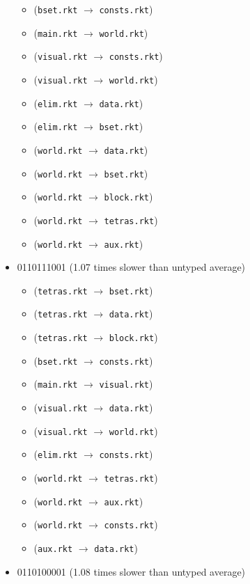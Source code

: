 \documentclass{article}
\newcommand{\mono}[1]{\texttt{#1}}
\begin{document}
\begin{itemize}
\begin{itemize}
  \item (\mono{bset.rkt} $\rightarrow$ \mono{consts.rkt})
  \item (\mono{main.rkt} $\rightarrow$ \mono{world.rkt})
  \item (\mono{visual.rkt} $\rightarrow$ \mono{consts.rkt})
  \item (\mono{visual.rkt} $\rightarrow$ \mono{world.rkt})
  \item (\mono{elim.rkt} $\rightarrow$ \mono{data.rkt})
  \item (\mono{elim.rkt} $\rightarrow$ \mono{bset.rkt})
  \item (\mono{world.rkt} $\rightarrow$ \mono{data.rkt})
  \item (\mono{world.rkt} $\rightarrow$ \mono{bset.rkt})
  \item (\mono{world.rkt} $\rightarrow$ \mono{block.rkt})
  \item (\mono{world.rkt} $\rightarrow$ \mono{tetras.rkt})
  \item (\mono{world.rkt} $\rightarrow$ \mono{aux.rkt})
  \end{itemize}
\item 0110111001 (1.07 times slower than untyped average)
  \begin{itemize}
  \item (\mono{tetras.rkt} $\rightarrow$ \mono{bset.rkt})
  \item (\mono{tetras.rkt} $\rightarrow$ \mono{data.rkt})
  \item (\mono{tetras.rkt} $\rightarrow$ \mono{block.rkt})
  \item (\mono{bset.rkt} $\rightarrow$ \mono{consts.rkt})
  \item (\mono{main.rkt} $\rightarrow$ \mono{visual.rkt})
  \item (\mono{visual.rkt} $\rightarrow$ \mono{data.rkt})
  \item (\mono{visual.rkt} $\rightarrow$ \mono{world.rkt})
  \item (\mono{elim.rkt} $\rightarrow$ \mono{consts.rkt})
  \item (\mono{world.rkt} $\rightarrow$ \mono{tetras.rkt})
  \item (\mono{world.rkt} $\rightarrow$ \mono{aux.rkt})
  \item (\mono{world.rkt} $\rightarrow$ \mono{consts.rkt})
  \item (\mono{aux.rkt} $\rightarrow$ \mono{data.rkt})
  \end{itemize}
\item 0110100001 (1.08 times slower than untyped average)

\end{itemize}
\end{document}
